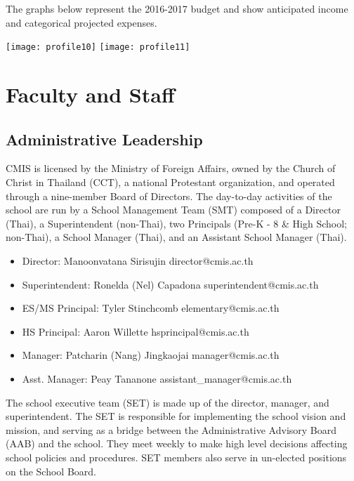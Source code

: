 
The graphs below represent the 2016-2017 budget and show anticipated income and categorical projected expenses.  

\texttt{[image: profile10]}
\texttt{[image: profile11]}

\section{Faculty and Staff}

\subsection{Administrative Leadership}

CMIS is licensed by the Ministry of Foreign Affairs, owned by the Church of Christ in Thailand (CCT), a national Protestant organization, and operated through a nine-member Board of Directors.  The day-to-day activities of the school are run by a School Management Team (SMT) composed of a Director (Thai), a Superintendent (non-Thai), two Principals (Pre-K - 8 \& High School; non-Thai), a School Manager (Thai), and an Assistant School Manager (Thai). 

\begin{itemize}
\item Director:  Manoonvatana Sirisujin         		director@cmis.ac.th
\item Superintendent:  Ronelda (Nel) Capadona	superintendent@cmis.ac.th
\item ES/MS Principal:  Tyler Stinchcomb	     	elementary@cmis.ac.th
\item HS Principal:  Aaron Willette		   	hsprincipal@cmis.ac.th	
\item Manager:  Patcharin (Nang) Jingkaojai		manager@cmis.ac.th
\item Asst. Manager:  Peay Tananone			assistant\_manager@cmis.ac.th
\end{itemize}


The school executive team (SET) is made up of the director, manager, and superintendent. The SET is responsible for implementing the school vision and mission, and serving as a bridge between the Administrative Advisory Board (AAB) and the school.  They meet weekly to make high level decisions affecting school policies and procedures.  SET members also serve in un-elected positions on the School Board.  

